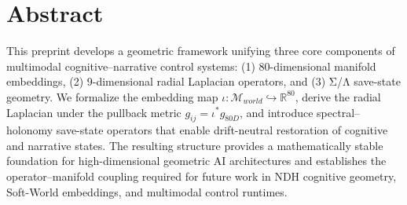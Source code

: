 \section*{Abstract}

This preprint develops a geometric framework unifying three core components of multimodal cognitive–narrative control systems: (1) 80-dimensional manifold embeddings, (2) 9-dimensional radial Laplacian operators, and (3) Σ/Λ save-state geometry. We formalize the embedding map $\iota : \mathcal{M}_{world} \hookrightarrow \mathbb{R}^{80}$, derive the radial Laplacian under the pullback metric $g_{ij} = \iota^* g_{80D}$, and introduce spectral–holonomy save-state operators that enable drift-neutral restoration of cognitive and narrative states. The resulting structure provides a mathematically stable foundation for high-dimensional geometric AI architectures and establishes the operator–manifold coupling required for future work in NDH cognitive geometry, Soft-World embeddings, and multimodal control runtimes.
